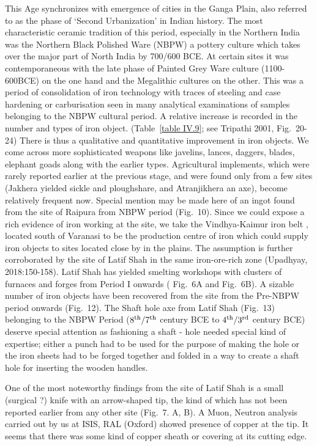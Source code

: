 This Age synchronizes with emergence of cities in the Ganga Plain, also referred to as the phase of ‘Second Urbanization’ in Indian history. The most characteristic ceramic tradition of this period, especially in the Northern India was the Northern Black Polished Ware (NBPW) a pottery culture which takes over the major part of North India by 700/600 BCE. At certain sites it was contemporaneous with the late phase of Painted Grey Ware culture (1100-600BCE) on the one hand and the Megalithic cultures on the other. This was a period of consolidation of iron technology with traces of steeling and case hardening or carburisation seen in many analytical examinations of samples belonging to the NBPW cultural period. A relative increase is recorded in the number and types of iron object. (Table~\ref{table IV.9}; see Tripathi 2001, Fig.~20-24) There is thus a qualitative and quantitative improvement in iron objects. We come across more sophisticated weapons like javelins, lances, daggers, blades, elephant goads along with the earlier types. Agricultural implements, which were rarely reported earlier at the previous stage, and were found only from a few sites (Jakhera yielded sickle and ploughshare, and Atranjikhera an axe), become relatively frequent now. Special mention may be made here of an ingot found from the site of Raipura from NBPW period (Fig.~10). Since we could expose a rich evidence of iron working at the site, we take the Vindhya-Kaimur iron belt , located south of Varanasi to be the production centre of iron which could supply iron objects to sites located close by in the plains. The assumption is further corroborated by the site of Latif Shah in the same iron-ore-rich zone (Upadhyay, 2018:150-158). Latif  Shah  has yielded smelting workshops with clusters of furnaces and forges from Period I onwards ( Fig.~6A and  Fig.~6B). A sizable number of iron objects have been recovered from the site from the Pre-NBPW period onwards (Fig.~12). The Shaft hole axe from Latif Shah (Fig.~13) belonging to the NBPW Period ($8^{\rm th}/7^{\rm th}$ century BCE to $4^{\rm th}/3^{\rm rd}$ century BCE) deserve special attention as fashioning a shaft - hole needed special kind of expertise; either a punch had to be used for the purpose of making the hole or the iron sheets had to be forged together and folded in a way to create a shaft hole for inserting the wooden handles. 

One of the most noteworthy findings from the site of Latif Shah is a small (surgical ?) knife with an arrow-shaped tip, the kind of which has not been reported earlier from any other site (Fig.~7. A, B). A Muon, Neutron analysis carried out by us at ISIS, RAL (Oxford) showed presence of copper at the tip. It seems that there was some kind of copper sheath or covering at its cutting edge. 

